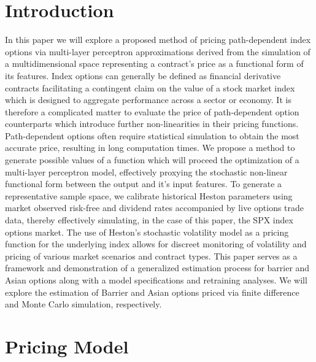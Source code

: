 \documentclass[11pt]{article}
\begin{document}
\section{Introduction}
	In this paper we will explore a proposed method of pricing path-dependent index options via multi-layer perceptron approximations derived from the simulation of a multidimensional space representing a contract's price as a functional form of its features. Index options can generally be defined as financial derivative contracts facilitating a contingent claim on the value of a stock market index which is designed to aggregate performance across a sector or economy. It is therefore a complicated matter to evaluate the price of path-dependent option counterparts which introduce further non-linearities in their pricing functions. Path-dependent options often require statistical simulation to obtain the most accurate price, resulting in long computation times. We propose a method to generate possible values of a function which will proceed the optimization of a multi-layer perceptron model, effectively proxying the stochastic non-linear functional form between the output and it's input features. To generate a representative sample space, we calibrate historical Heston \cite{heston_1993_a} parameters using market observed risk-free and dividend rates accompanied by live options trade data, thereby effectively simulating, in the case of this paper, the SPX index options market. The use of Heston's \cite{heston_1993_a} stochastic volatility model as a pricing function for the underlying index allows for discreet monitoring of volatility and pricing of various market scenarios and contract types. This paper serves as a framework and demonstration of a generalized estimation process for barrier and Asian options along with a model specifications and retraining analyses. We will explore the estimation of Barrier and Asian options priced via finite difference and Monte Carlo simulation, respectively.

\section{Pricing Model}
\end{document}

